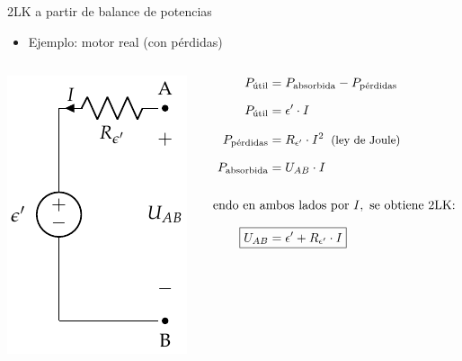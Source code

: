 \documentclass[aspectratio=169, xcolor={usenames,svgnames,dvipsnames}]{beamer}
\begin{document}
\begin{frame}{2LK a partir de balance de potencias}
    \begin{itemize}
        \item Ejemplo: \alert{motor} real (con pérdidas)
    \end{itemize}
    \begin{columns}
    \begin{column}{0.3\columnwidth}
        \begin{center}
        \includegraphics[height=0.6\textheight]{../figs/receptor_real.pdf}        
        \end{center}
    \end{column}
    \begin{column}{0.4\columnwidth}
    \begin{align*}
        P_{\textrm{útil}} &= P_{\textrm{absorbida}} - P_{\textrm{pérdidas}}\\[7pt]
        P_{\textrm{útil}} &= \epsilon'\cdot I\\[7pt]
        P_{\textrm{pérdidas}} &= R_{\epsilon'}\cdot I^2 \;\; \text{\small{(ley de Joule)}}\\[7pt]
        P_{\textrm{absorbida}} &= U_{AB}\cdot I\\[15pt]
        & \hspace{-25mm}\text{Dividiendo en ambos lados por } I, \text{ se obtiene 2LK:}\\[7pt]
        \Aboxed{U_{AB}&=\epsilon'+R_{\epsilon'}\cdot I}
    \end{align*}
    \end{column}
    \end{columns}
\end{frame}

\end{document}
